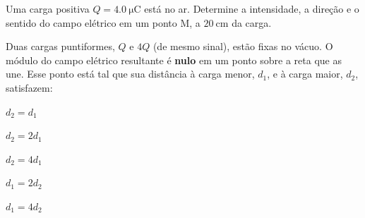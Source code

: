 \begin{questao}[2]{}
Uma carga positiva $Q = \SI{4.0}{\micro\coulomb}$ está no ar. Determine a
intensidade, a direção e o sentido do campo elétrico em um ponto M, a
$\SI{20}{\centi\meter}$ da carga.
\end{questao}

\begin{questao}[2]{}
Duas cargas puntiformes, $Q$ e $4Q$ (de mesmo sinal), estão fixas no vácuo. O
módulo do campo elétrico resultante é \textbf{nulo} em um ponto sobre a reta que
as une. Esse ponto está tal que sua distância à carga menor, $d_1$, e à carga
maior, $d_2$, satisfazem:
\begin{alternativas}[2]
\item $d_2 = d_1$
\item $d_2 = 2d_1$
\item $d_2 = 4d_1$
\item $d_1 = 2d_2$
\item $d_1 = 4d_2$
\end{alternativas}
\end{questao}

